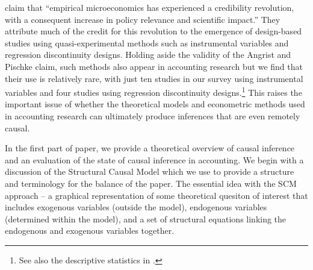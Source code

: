 \documentclass[11pt]{amsart}
\begin{document}
\cite{Angrist:2010jv} claim that ``empirical microeconomics has experienced a credibility revolution, with a consequent increase in policy relevance and scientific impact.''
They attribute much of the credit for this revolution to the emergence of design-based studies using quasi-experimental methods such as instrumental variables and regression discontinuity designs.
Holding aside the validity of the Angrist and Pischke claim, such methods also appear in accounting research but we find that their use is relatively rare, with just ten studies in our survey using instrumental variables and four studies using regression discontinuity designs.\footnote{See also the descriptive statistics in \citep{Larcker:2010fq}.}  This raises the important issue of whether the theoretical models and econometric methods used in accounting research can ultimately produce inferences that are even remotely causal.

In the first part of paper, we provide a theoretical overview of causal inference and an evaluation of the state of causal inference in accounting. We begin with a discussion of the Structural Causal Model \citep{Pearl:2009kh} which we use to provide a structure and terminology for the balance of the paper.  
The essential idea with the SCM approach -- a graphical representation of some theoretical quesiton of interest that includes exogenous variables (outside the model), endogenous variables (determined within the model), and a set of structural equations linking the endogenous and exogenous variables together.  


\end{document}
